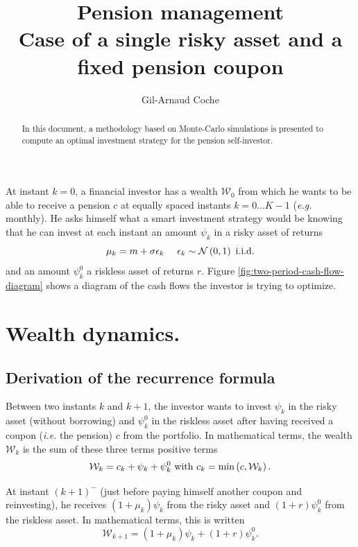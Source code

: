 \documentclass{article}
\newcommand{\W}{\mathcal{W}}
\newcommand{\N}{\mathcal{N}}
\begin{document}

\setlength{\parindent}{0pt}

\title{\huge Pension management \\ \Large Case of a single risky asset and a fixed pension coupon}

\author{Gil-Arnaud Coche}

\maketitle

\begin{abstract}
In this document, a methodology based on Monte-Carlo simulations is presented to compute an optimal investment strategy for the pension self-investor. 
\end{abstract}

At instant $k = 0$, a financial investor has a wealth $\W_0$ from which he wants to be able to receive a pension $c$ at equally spaced instants $k=0\dots K-1$ (\textit{e.g.} monthly). He asks himself what a smart investment strategy would be knowing that he can invest at each instant an amount $\psi_k$ in a risky asset of returns
$$
\mu_k = m + \sigma\epsilon_k\ \ \ \ \epsilon_k\sim\N\left(0, 1\right) \textnormal{ i.i.d.}
$$
and an amount $\psi^0_k$ a riskless asset of returns $r$. Figure \ref{fig:two-period-cash-flow-diagram} shows a diagram of the cash flows the investor is trying to optimize.



\section{Wealth dynamics.}

\subsection{Derivation of the recurrence formula}

Between two instants $k$ and $k + 1$, the investor wants to invest $\psi_k$ in the risky asset (without borrowing) and $\psi_k^0$ in the riskless asset after having received a coupon (\textit{i.e.} the pension) $c$ from the portfolio. In mathematical terms, the wealth $\W_k$ is the sum of these three terms positive terms
$$
\W_k = c_k + \psi_k + \psi_k^0 \textnormal{ with } c_k = \min\left(c, \W_k\right).
$$

At instant $(k + 1)^-$ (just before paying himself another coupon and reinvesting), he receives $(1 + \mu_k)\psi_k$ from the risky asset and $(1 + r)\psi_k^0$ from the riskless asset. In mathematical terms, this is written
$$
\W_{k + 1} = (1 + \mu_k)\psi_k + (1 + r)\psi_k^0.
$$
\end{document}
